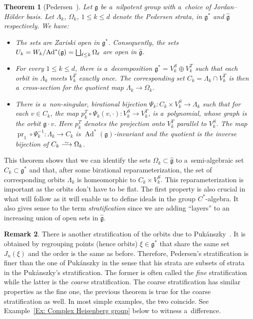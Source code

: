 \documentclass[10pt,a4paper]{article}
\newcommand{\Ad}{\operatorname{Ad}} %
\newcommand{\g}{\mathfrak{g}} %
\newcommand{\pr}{\operatorname{pr}} %
\newcommand\isomto{\stackrel{\sim}{\smash{\longrightarrow}\rule{0pt}{0.4ex}}}
\numberwithin{equation}{section}
\newtheorem{thm}{Theorem}[section]
\theoremstyle{definition}
\newtheorem{rem}[thm]{Remark}
\begin{document}
\begin{thm}[Pedersen~\cite{PedersenStratification}]\label{Theorem:ClassicPedersecStrat}
 Let $\g$ be a~nilpotent group with a~choice of Jordan--H\"older basis. Let $\Lambda_k$, $\Omega_k$, $1\leq k \leq d$ denote the Pedersen strata, in $\g^*$ and $\widehat{\g}$ respectively. We have:
 \begin{itemize}
\itemsep=0pt
 \item The sets  are Zariski open in $\g^*$. Consequently, the sets $U_k = \smash{{W_k}/{\Ad^*(\g)}} = \smash{ \bigsqcup_{\ell\leq k}\Omega_{\ell}}$ are open in $\widehat{\g}$.
 \item For every $1\leq k \leq d$, there is a~decomposition $\g^* = V_k^S\oplus V_k^T$ such that each orbit in $\Lambda_k$ meets $V_k^T$ exactly once. The corresponding set $C_k = \Lambda_k \cap V_k^T$ is then a~cross-section for the quotient map $\Lambda_k \to \Omega_k$.
 \item There is a~non-singular, birational bijection $\Psi_k \colon C_k \times V_k^S \to \Lambda_k$ such that for each $v\in C_k$, the map $p_k^T \circ \Psi_k(v,\cdot) \colon V_k^S \to V_k^T$,
 is a~polynomial, whose graph is the orbit $\g \cdot v$. Here $p_k^T$ denotes the projection onto $V_k^T$ parallel to $V_k^S$. The map $\pr_1\circ \Psi_k^{-1} \colon \Lambda_k \to C_k$
 is $\Ad^*(\g)$-invariant and the quotient is the inverse bijection of $C_k \isomto \Omega_k$.
 \end{itemize}
\end{thm}

This theorem shows that we can identify the sets $\Omega_k\subset \widehat{\g}$ to a~semi-algebraic set ${C_k \subset \g^*}$ and that, after some birational reparameterization, the set of corresponding orbits $\Lambda_k$ is homeo\-morphic to $C_k \times V_k^S$. This reparameterization is important as the orbits don't have to be flat. The first property is also crucial in what will follow as it will enable us to define ideals in the group $C^*$-algebra. It also gives sense to the term \emph{stratification} since we are adding ``layers'' to an increasing union of open sets in $\widehat{\g}$.

\begin{rem}
 There is another stratification of the orbits due to Puk\'anszky~\cite{Pukanszky}. It is obtained by regrouping points (hence orbits) $\xi \in\g^*$ that share the same set $J_n(\xi)$ and the order is the same as before. Therefore, Pedersen's stratification is finer than the one of Puk\'anszky in the sense that his strata are subsets of strata in the Puk\'anszky's stratification. The former is often called the \emph{fine} stratification while the latter is the \emph{coarse} stratification. The coarse stratification has similar properties as the fine one, the previous theorem is true for the coarse stratification as well. In most simple examples, the two coincide. See Example~\ref{Ex: Complex Heisenberg group} below to witness a~difference.
\end{rem}
\end{document}
